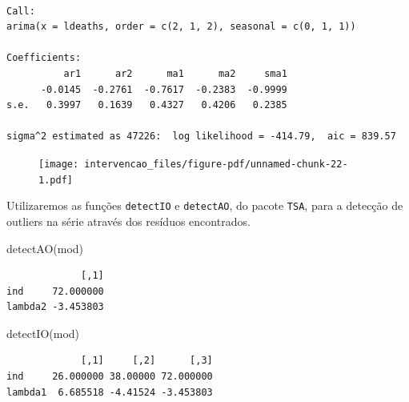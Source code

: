 \documentclass[
  letterpaper,
  DIV=11,
  numbers=noendperiod]{scrartcl}
\newenvironment{Shaded}{\begin{snugshade}}{\end{snugshade}}
\newcommand{\DecValTok}[1]{\textcolor[rgb]{0.68,0.00,0.00}{#1}}
\newcommand{\FunctionTok}[1]{\textcolor[rgb]{0.28,0.35,0.67}{#1}}
\newcommand{\NormalTok}[1]{\textcolor[rgb]{0.00,0.23,0.31}{#1}}
\newcommand{\SpecialCharTok}[1]{\textcolor[rgb]{0.37,0.37,0.37}{#1}}
\theoremstyle{plain}
\theoremstyle{plain}
\theoremstyle{definition}
\theoremstyle{definition}
\theoremstyle{remark}
\begin{document}
\begin{verbatim}

Call:
arima(x = ldeaths, order = c(2, 1, 2), seasonal = c(0, 1, 1))

Coefficients:
          ar1      ar2      ma1      ma2     sma1
      -0.0145  -0.2761  -0.7617  -0.2383  -0.9999
s.e.   0.3997   0.1639   0.4327   0.4206   0.2385

sigma^2 estimated as 47226:  log likelihood = -414.79,  aic = 839.57
\end{verbatim}

\begin{Shaded}
\end{Shaded}

\begin{figure}[H]

{\centering \texttt{[image: intervencao\_files/figure-pdf/unnamed-chunk-22-1.pdf]}

}

\end{figure}

Utilizaremos as funções \texttt{detectIO} e \texttt{detectAO}, do pacote
\texttt{TSA}, para a detecção de outliers na série através dos resíduos
encontrados.

\begin{Shaded}
\begin{Highlighting}[]
\FunctionTok{detectAO}\NormalTok{(mod)}
\end{Highlighting}
\end{Shaded}

\begin{verbatim}
             [,1]
ind     72.000000
lambda2 -3.453803
\end{verbatim}

\begin{Shaded}
\begin{Highlighting}[]
\FunctionTok{detectIO}\NormalTok{(mod)}
\end{Highlighting}
\end{Shaded}

\begin{verbatim}
             [,1]     [,2]      [,3]
ind     26.000000 38.00000 72.000000
lambda1  6.685518 -4.41524 -3.453803
\end{verbatim}
\end{document}
